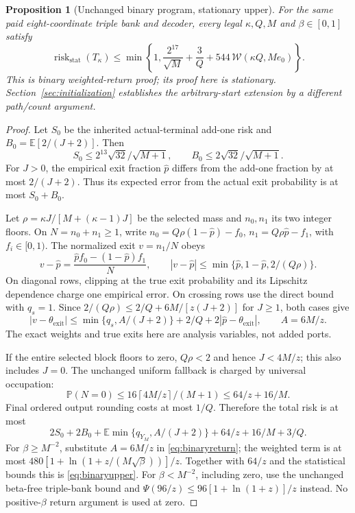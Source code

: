 \documentclass[11pt,letterpaper]{article}
\newtheorem{proposition}[theorem]{Proposition}
\theoremstyle{definition}\newtheorem{definition}[theorem]{Definition}
\theoremstyle{remark}\newtheorem{remark}[theorem]{Remark}
\newcommand{\E}{\mathbb{E}}
\newcommand{\Prob}{\mathbb{P}}
\newcommand{\ceil}[1]{\left\lceil #1\right\rceil}
\begin{document}
\begin{proposition}[Unchanged binary program, stationary upper]\label{prop:binaryupper}
For the same paid eight-coordinate triple bank and decoder, every legal $\kappa,Q,M$ and $\beta\in[0,1]$ satisfy
\begin{equation}\label{eq:binaryupper}
 \operatorname{risk}_{\mathrm{stat}}(T_\kappa)
 \le\min\left\{1,\frac{2^{17}}{\sqrt M}+\frac3Q+
 544\,\mathcal W(\kappa Q,Me_0)\right\}.
\end{equation}
This is binary weighted-return proof; its proof here is stationary. Section~\ref{sec:initialization} establishes the arbitrary-start extension by a different path/count argument.
\end{proposition}
\begin{proof}
Let $S_0$ be the inherited actual-terminal add-one risk and
$B_0=\E[2/(J+2)]$. Then
\[
 S_0\le2^{13}\sqrt{32}/\sqrt{M+1},\qquad
 B_0\le2\sqrt{32}/\sqrt{M+1}.
\]
For $J>0$, the empirical exit fraction $\widehat p$ differs from the add-one fraction by at most $2/(J+2)$. Thus its expected error from the actual exit probability is at most $S_0+B_0$.

Let $\rho=\kappa J/[M+(\kappa-1)J]$ be the selected mass and $n_0,n_1$ its two integer floors. On $N=n_0+n_1\ge1$, write
$n_0=Q\rho(1-\widehat p)-f_0$,
$n_1=Q\rho\widehat p-f_1$, with $f_i\in[0,1)$.
The normalized exit $v=n_1/N$ obeys
\[
 v-\widehat p=
 \frac{\widehat p f_0-(1-\widehat p)f_1}{N},\qquad
 |v-\widehat p|
 \le\min\{\widehat p,1-\widehat p,2/(Q\rho)\}.
\]
On diagonal rows, clipping at the true exit probability and its Lipschitz dependence charge one empirical error. On crossing rows use the direct bound with $q_s=1$. Since
$2/(Q\rho)\le2/Q+6M/[z(J+2)]$ for $J\ge1$, both cases give
\[
 |v-\theta_{\mathrm{exit}}|
 \le\min\{q_s,A/(J+2)\}+2/Q
       +2|\widehat p-\theta_{\mathrm{exit}}|,\qquad A=6M/z.
\]
The exact weights and true exits here are analysis variables, not added ports.

If the entire selected block floors to zero, $Q\rho<2$ and hence $J<4M/z$; this also includes $J=0$. The unchanged uniform fallback is charged by universal occupation:
\[
 \Prob(N=0)\le16\ceil{4M/z}/(M+1)\le64/z+16/M.
\]
Final ordered output rounding costs at most $1/Q$. Therefore the total risk is at most
\[
 2S_0+2B_0+\E\min\{q_{Y_M},A/(J+2)\}
       +64/z+16/M+3/Q.
\]
For $\beta\ge M^{-2}$, substitute $A=6M/z$ in
\eqref{eq:binaryreturn}; the weighted term is at most
$480[1+\ln(1+z/(M\sqrt\beta))]/z$.
Together with $64/z$ and the statistical bounds this is
\eqref{eq:binaryupper}. For $\beta<M^{-2}$, including zero, use the unchanged beta-free triple-bank bound and
$\Psi(96/z)\le96[1+\ln(1+z)]/z$ instead. No positive-$\beta$ return argument is used at zero.
\end{proof}
\end{document}
